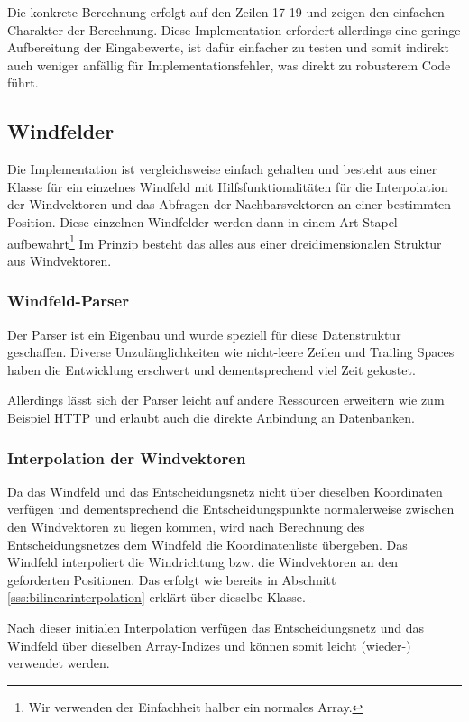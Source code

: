  
Die konkrete Berechnung erfolgt auf den Zeilen 17-19 und zeigen den einfachen
Charakter der Berechnung. Diese Implementation erfordert allerdings eine
geringe Aufbereitung der Eingabewerte, ist dafür einfacher zu testen und somit
indirekt auch weniger anfällig für Implementationsfehler, was direkt zu
robusterem Code führt.

\subsection{Windfelder}
Die Implementation ist vergleichsweise einfach gehalten und besteht aus einer
Klasse für ein einzelnes Windfeld mit Hilfsfunktionalitäten für die
Interpolation der Windvektoren und das Abfragen der Nachbarsvektoren an einer
bestimmten Position. Diese einzelnen Windfelder werden dann in einem Art Stapel
aufbewahrt\footnote{Wir verwenden der Einfachheit halber ein normales Array.}
Im Prinzip besteht das alles aus einer dreidimensionalen Struktur aus
Windvektoren.

\subsubsection{Windfeld-Parser}
Der Parser ist ein Eigenbau und wurde speziell für diese Datenstruktur
geschaffen. Diverse Unzulänglichkeiten wie nicht-leere Zeilen und Trailing
Spaces haben die Entwicklung erschwert und dementsprechend viel Zeit gekostet.

Allerdings lässt sich der Parser leicht auf andere Ressourcen erweitern wie zum
Beispiel HTTP und erlaubt auch die direkte Anbindung an Datenbanken.

\subsubsection{Interpolation der Windvektoren}
Da das Windfeld und das Entscheidungsnetz nicht über dieselben Koordinaten
verfügen und dementsprechend die Entscheidungspunkte normalerweise zwischen den
Windvektoren zu liegen kommen, wird nach Berechnung des Entscheidungsnetzes dem
Windfeld die Koordinatenliste übergeben. Das Windfeld interpoliert die
Windrichtung bzw. die Windvektoren an den geforderten Positionen. Das erfolgt
wie bereits in Abschnitt \ref{sss:bilinearinterpolation} erklärt über dieselbe
Klasse.

Nach dieser initialen Interpolation verfügen das Entscheidungsnetz und das
Windfeld über dieselben Array-Indizes und können somit leicht (wieder-)
verwendet werden.

